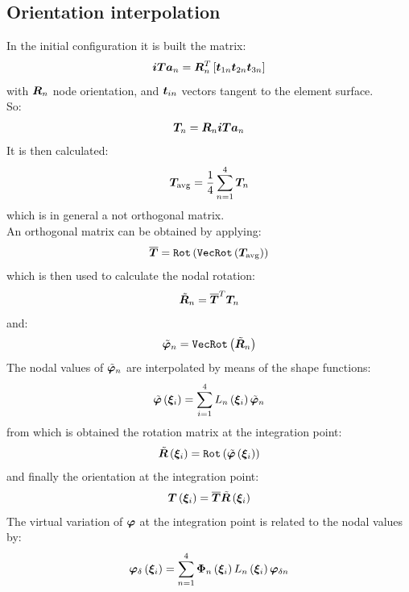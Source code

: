 \subsection{Orientation interpolation}
In the initial configuration it is built the matrix:
\begin{equation}
\bm{ iTa }_n = \bm{R}_n^T \left[  \bm{ t }_{ 1n } \bm{ t }_{ 2n } \bm{ t }_{ 3n }  \right]
\end{equation}
with $\bm{R}_n$ node orientation, and $\bm{t}_{in}$ vectors tangent to the element surface.\\
So:
\begin{equation}
\bm{T}_{n} = \bm{R}_n \bm{ iTa }_n
\end{equation}
It is then calculated:
\begin{equation}
\bm{T}_\text{avg} = \frac{ \displaystyle{  1  } }{ \displaystyle{  4  }} \sum_{ n = 1 }^{ 4 } \bm{T}_n
\end{equation}
which is in general a not orthogonal matrix.\\
An orthogonal matrix can be obtained by applying:
\begin{equation}
\overline{ \bm{T} } = \texttt{Rot} \left(   \texttt{VecRot} \left(   \bm{T}_\text{avg}   \right)    \right)
\end{equation}
which is then used to calculate the nodal rotation:
\begin{equation}
\tilde{ \bm{R} }_{ n } = \overline{ \bm{T} } ^T \bm{T}_n
\end{equation}
and:
\begin{equation}
\tilde{ \bm{\varphi} }_n = \texttt{VecRot} \left(   \tilde{ \bm{R} }_n   \right)
\end{equation}
The nodal values of $\tilde{ \bm{\varphi} }_n$ are interpolated by means of the shape functions:
\begin{equation}
\tilde{ \bm{ \varphi } } \left(  \bm{ \xi }_{ i }  \right) = \sum_{ i = 1 }^{ 4 } L_n \left(  \bm{ \xi }_{ i }  \right) \tilde{ \bm{ \varphi } }_n
\end{equation}
from which is obtained the rotation matrix at the integration point:
\begin{equation}
\tilde{ \bm{R} } \left(  \bm{ \xi }_{ i }  \right) = \texttt{Rot} \left(   \tilde{ \bm{\varphi} } \left(  \bm{ \xi }_{ i }  \right)   \right)
\end{equation}
and finally the orientation at the integration point:
\begin{equation}
\bm{T} \left(  \bm{ \xi }_{ i }  \right) = \overline{ \bm{T} } \tilde{ \bm{R} } \left(  \bm{ \xi }_{ i }  \right)
\end{equation}
The virtual variation of $\bm{\varphi}$ at the integration point is related to the nodal values by:
\begin{equation}
\bm{ \varphi }_{\delta} \left(  \bm{ \xi }_{ i }  \right) =
\sum_{ n = 1 }^{ 4 } \bm{ \Phi }_n \left(  \bm{ \xi }_{ i }  \right) L_n \left(  \bm{ \xi }_{ i }  \right) \bm{\varphi}_{\delta n}
\end{equation}
